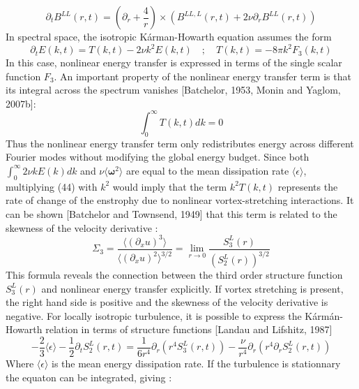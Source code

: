 \begin{equation}
    \partial_tB^{LL}(r,t)=\left(\partial_r+\frac{4}{r}\right)\times(B^{LL,L}(r,t)+2\nu\partial_rB^{LL}(r,t))
\end{equation}
In spectral space, the isotropic Kárman-Howarth equation assumes the form
\begin{equation}
    \partial_tE(k,t)=T(k,t)-2\nu k^2E(k,t)\quad;\quad T(k,t)=-8\pi k^2F_3(k,t)
\end{equation}
In this case, nonlinear energy transfer is expressed in terms of the single scalar function $F_3$.
An important property of the nonlinear energy transfer term is that its integral across the spectrum vanishes [Batchelor, 1953, Monin and Yaglom, 2007b]:
\begin{equation}
    \int_0^\infty T(k,t)dk=0
\end{equation}
Thus the nonlinear energy transfer term only redistributes energy across different Fourier modes without modifying the global energy budget. 
Since both $\displaystyle \int_0^\infty 2\nu kE(k)dk$ and $\nu\langle\boldsymbol{\omega}^2\rangle$ are equal to the mean dissipation rate $\langle\epsilon\rangle$, multiplying (44) with $k^2$ would imply that the term $k^2T(k,t)$ represents the rate of change of the enstrophy
due to nonlinear vortex-stretching interactions. It can be shown [Batchelor and Townsend, 1949] that this term is related to the skewness of the velocity derivative :
\begin{equation}
    \Sigma_3=\frac{\langle(\partial_x u)^3\rangle}{\langle(\partial_x u)^2\rangle^{3/2}}=\lim_{r\rightarrow0}\frac{S_3^L(r)}{(S_2^L(r))^{3/2}}
\end{equation}
This formula reveals the connection between the third order structure function $S_3^L(r)$ and nonlinear energy transfer explicitly. If vortex stretching is present, the right hand side is positive and the skewness of the velocity derivative is negative.
For locally isotropic turbulence, it is possible to express the Kármán-Howarth relation in terms of structure functions [Landau and Lifshitz, 1987]
\begin{equation}
    -\frac{2}{3}\langle\epsilon\rangle-\frac{1}{2}\partial_tS_2^L(r,t)=\frac{1}{6r^4}\partial_r(r^4S_3^L(r,t))-\frac{\nu}{r^4}\partial_r(r^4\partial_rS_2^L(r,t))
\end{equation}
Where $\langle\epsilon\rangle$ is the mean energy dissipation rate. If the turbulence is stationnary the equaton can be integrated, giving :
